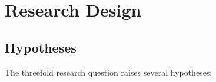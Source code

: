 





\section{Research Design}

\subsection{Hypotheses}
The threefold research question raises several hypotheses:

